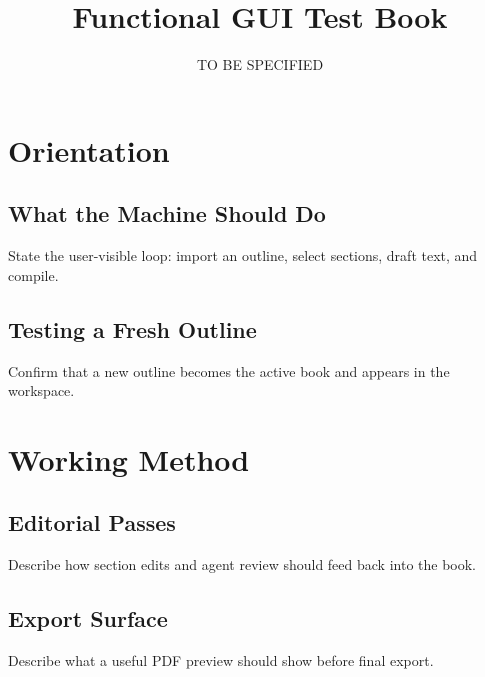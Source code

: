 \documentclass[11pt]{article}
\title{Functional GUI Test Book}
\author{TO BE SPECIFIED}
\begin{document}
\maketitle

\section{Orientation}

\subsection{What the Machine Should Do}

State the user-visible loop: import an outline, select sections, draft text, and compile.


\subsection{Testing a Fresh Outline}

Confirm that a new outline becomes the active book and appears in the workspace.


\section{Working Method}

\subsection{Editorial Passes}

Describe how section edits and agent review should feed back into the book.


\subsection{Export Surface}

Describe what a useful PDF preview should show before final export.
\end{document}
